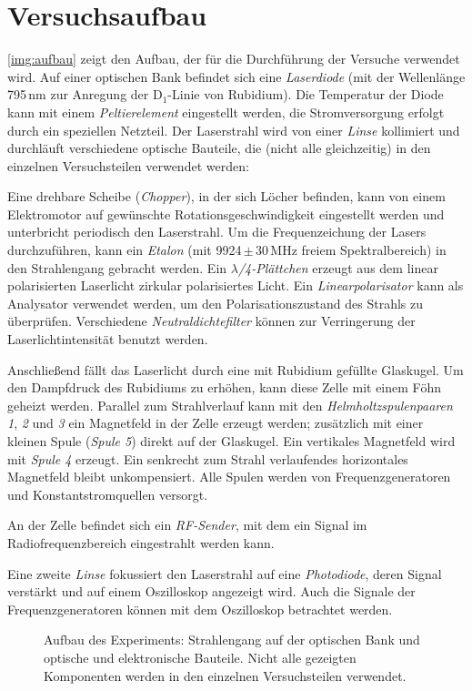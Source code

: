 \section{Versuchsaufbau}
\autoref{img:aufbau} zeigt den Aufbau, der für die Durchführung der Versuche
verwendet wird.
Auf einer optischen Bank befindet sich eine \emph{Laserdiode} (mit der Wellenlänge
795\,nm zur Anregung der D$_1$-Linie von Rubidium).
Die Temperatur der Diode kann mit einem \emph{Peltierelement} eingestellt werden,
die Stromversorgung erfolgt durch ein speziellen Netzteil.
Der Laserstrahl wird von einer \emph{Linse} kollimiert und durchläuft verschiedene
optische Bauteile, die (nicht alle gleichzeitig) in den einzelnen Versuchsteilen
verwendet werden:

Eine drehbare Scheibe (\emph{Chopper}), in der sich Löcher befinden, kann von
einem Elektromotor auf gewünschte Rotationsgeschwindigkeit eingestellt werden und unterbricht periodisch
den Laserstrahl.
Um die Fre\-quenz\-eich\-ung der Lasers durchzuführen, kann ein \emph{Etalon}
(mit 9924\,$\pm$\,30\,MHz freiem Spektralbereich) in den Strahlengang gebracht werden.
Ein \emph{$\lambda$/4-Plättchen} erzeugt aus dem linear polarisierten Laserlicht zirkular polarisiertes Licht.
Ein \emph{Linearpolarisator} kann als Analysator verwendet werden, um den Polarisationszustand
des Strahls zu überprüfen. Verschiedene \emph{Neutraldichtefilter} können zur Verringerung der Laserlichtintensität
benutzt werden.

Anschließend fällt das Laserlicht durch eine mit Rubidium gefüllte Glaskugel.
Um den Dampfdruck des Rubidiums zu erhöhen, kann diese Zelle mit einem Föhn geheizt werden.
Parallel zum Strahlverlauf kann mit den \emph{Helmholtzspulenpaaren 1}, \emph{2} und \emph{3}
ein Magnetfeld in der Zelle erzeugt werden;
zusätzlich mit einer kleinen Spule (\emph{Spule 5}) direkt auf der Glaskugel.
Ein vertikales Magnetfeld wird mit \emph{Spule 4} erzeugt.
Ein senkrecht zum Strahl verlaufendes horizontales Magnetfeld bleibt unkompensiert.
Alle Spulen werden von Frequenzgeneratoren und Konstantstromquellen versorgt.

An der Zelle befindet sich ein \emph{RF-Sender}, mit dem ein Signal im Radiofrequenzbereich eingestrahlt werden kann.

Eine zweite \emph{Linse} fokussiert den Laserstrahl auf eine \emph{Photodiode}, deren Signal verstärkt und auf
einem Oszilloskop angezeigt wird.
Auch die Signale der Frequenzgeneratoren können mit dem Oszilloskop betrachtet werden.


\begin{landscape}

\begin{figure}[H]
        \def\svgwidth{1.4\textwidth}
        
        \caption{Aufbau des Experiments: Strahlengang auf der optischen Bank
        und optische und elektronische Bauteile.
        Nicht alle gezeigten Komponenten werden in den einzelnen
        Versuchsteilen verwendet.}
        \label{img:aufbau}
\end{figure}

\end{landscape}
